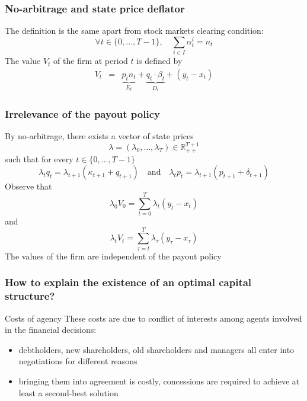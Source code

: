 \documentclass[blue]{beamer}
\def\R{\mathbb{R}}
\def\et{\quad \textrm{and} \quad}
\DeclareMathOperator\DIV{DIV}
\theoremstyle{definition}
\theoremstyle{example}
\begin{document}

\begin{frame}\frametitle{No-arbitrage and state price deflator}

The definition is the same apart from stock markets clearing condition:
\[
\forall t \in \{0,\ldots,T-1\}, \quad \sum_{i\in I} \alpha^i_t = n_t
\]
The value $V_t$ of the firm at period $t$ is defined by
\begin{eqnarray*}
V_t & = & \underbrace{p_t n_t}_{E_t}  +  \underbrace{q_t\cdot \beta_t}_{D_t} + (y_t-x_t) %
\end{eqnarray*}
\end{frame}


\begin{frame}\frametitle{Irrelevance of the payout policy}

By no-arbitrage, there exists a vector of state prices
\[
\lambda = (\lambda_0,\ldots,\lambda_T) \in \R^{T+1}_{++}
\]
such that for every $t \in \{0,\ldots,T-1\}$
\[
\lambda_t q_t = \lambda_{t+1} (\kappa_{t+1} + q_{t+1}) \et \lambda_t p_t = \lambda_{t+1} (p_{t+1} + \delta_{t+1})
\]
Observe that
\[
\lambda_0 V_0 = \sum_{t=0}^T \lambda_t (y_t-x_t)
\]
and
\[
\lambda_t V_t = \sum_{\tau=t}^T \lambda_\tau (y_\tau-x_\tau)
\]
The values of the firm are independent of the payout policy

\end{frame}


\begin{frame}\frametitle{How to explain the existence of an optimal capital structure?}

\begin{block}{Costs of agency}
These costs are due to conflict of interests among agents involved in the financial decisions:
\begin{itemize}
\item debtholders, new shareholders, old shareholders and managers all enter into negotiations for different reasons
\item bringing them into agreement is costly, concessions are required to achieve at least a second-best solution
\end{itemize}
\end{block}

\end{frame}
\end{document}
